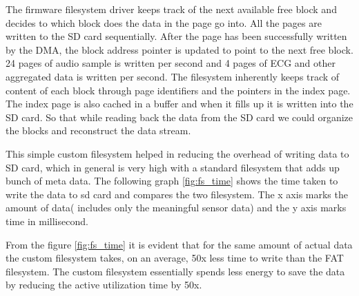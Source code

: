  \hspace{10mm}The firmware filesystem driver keeps track of the next available free block and decides to which block does the data in the page go into. All the pages are written to the SD card sequentially. After the page has been successfully written by the DMA, the block address pointer is updated to point to the next free block. 24 pages of audio sample is written per second and 4 pages of ECG and other aggregated data is written per second. The filesystem inherently keeps track of content of each block through page identifiers and the pointers in the index page. The index page is also cached in a buffer and when it fills up it is written into the SD card. So that while reading back the data from the SD card we could organize the blocks and reconstruct the data stream.  

 \hspace{10mm}This simple custom filesystem helped in reducing the overhead of writing data to SD card, which in general is very high with a standard filesystem that adds up bunch of meta data. The following graph \ref{fig:fs_time} shows the time taken to write the data to sd card and compares the two filesystem. The x axis marks the amount of data( includes only the meaningful sensor data) and the y axis marks time in millisecond.
{
\centering
{}\label{fig:fs_time}

}

 \hspace{10mm}From the figure \ref{fig:fs_time} it is evident that for the same amount of actual data the custom filesystem takes, on an average, 50x less time to write than the FAT filesystem. The custom filesystem essentially spends less energy to save the data by reducing the active utilization time by 50x. 

